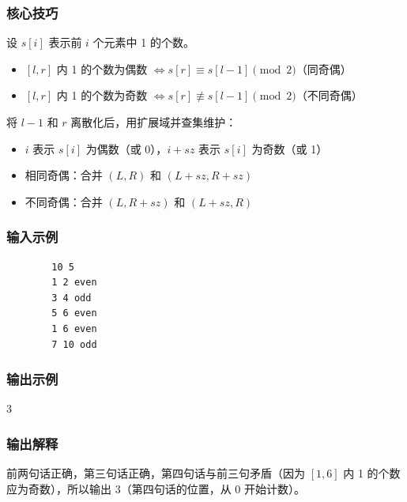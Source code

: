 \documentclass[12pt,a4paper]{ctexart}
\begin{document}
	\subsubsection*{核心技巧}
	设 $s[i]$ 表示前 $i$ 个元素中 1 的个数。
	\begin{itemize}
		\item $[l, r]$ 内 1 的个数为偶数 $\iff s[r] \equiv s[l-1] \pmod{2}$（同奇偶）
		\item $[l, r]$ 内 1 的个数为奇数 $\iff s[r] \not\equiv s[l-1] \pmod{2}$（不同奇偶）
	\end{itemize}
	将 $l-1$ 和 $r$ 离散化后，用扩展域并查集维护：
	\begin{itemize}
		\item $i$ 表示 $s[i]$ 为偶数（或 0），$i + sz$ 表示 $s[i]$ 为奇数（或 1）
		\item 相同奇偶：合并 $(L, R)$ 和 $(L+sz, R+sz)$
		\item 不同奇偶：合并 $(L, R+sz)$ 和 $(L+sz, R)$
	\end{itemize}
	
	\subsubsection*{输入示例}
	\begin{verbatim}
		10 5
		1 2 even
		3 4 odd
		5 6 even
		1 6 even
		7 10 odd
	\end{verbatim}
	
	\subsubsection*{输出示例}
	3
	
	\subsubsection*{输出解释}
	前两句话正确，第三句话正确，第四句话与前三句矛盾（因为 $[1,6]$ 内 1 的个数应为奇数），所以输出 3（第四句话的位置，从 0 开始计数）。
	
\end{document}
